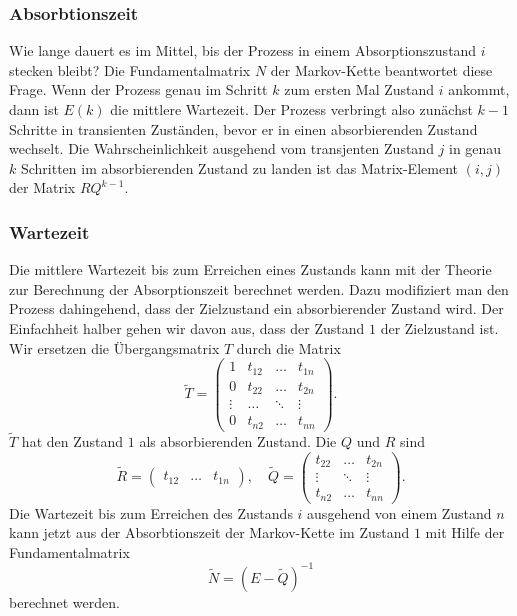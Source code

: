\subsubsection{Absorbtionszeit}
Wie lange dauert es im Mittel, bis der Prozess in einem
Absorptionszustand $i$ stecken bleibt?
Die Fundamentalmatrix $N$ der Markov-Kette beantwortet diese
Frage.
Wenn der Prozess genau im Schritt $k$ zum ersten Mal Zustand $i$
ankommt, dann ist $E(k)$ die mittlere Wartezeit.
Der Prozess verbringt also zunächst $k-1$ Schritte in transienten
Zuständen, bevor er in einen absorbierenden Zustand wechselt.
Die Wahrscheinlichkeit ausgehend vom transjenten Zustand $j$ in
genau $k$ Schritten im absorbierenden Zustand zu landen ist
das Matrix-Element $(i,j)$ der Matrix $RQ^{k-1}$.

\subsubsection{Wartezeit}
Die mittlere Wartezeit bis zum Erreichen eines Zustands kann mit der
Theorie zur Berechnung der Absorptionszeit berechnet werden.
Dazu modifiziert man den Prozess dahingehend, dass der Zielzustand
ein absorbierender Zustand wird.
Der Einfachheit halber gehen wir davon aus, dass der Zustand $1$ 
der Zielzustand ist.
Wir ersetzen die Übergangsmatrix $T$ durch die Matrix
\[
\tilde{T}
=
\left(
\begin{array}{c|ccc}
1     &t_{12}&\dots &t_{1n}\\
\hline
0     &t_{22}&\dots &t_{2n}\\
\vdots&\dots &\ddots&\vdots\\
0     &t_{n2}&\dots &t_{nn}
\end{array}\right).
\]
$\tilde{T}$ hat den Zustand $1$ als absorbierenden Zustand.
Die $Q$ und $R$ sind
\[
\tilde{R}
=
\begin{pmatrix}t_{12}&\dots&t_{1n}\end{pmatrix},
\quad
\tilde{Q}
=
\begin{pmatrix}
t_{22}&\dots &t_{2n}\\
\vdots&\ddots&\vdots\\
t_{n2}&\dots &t_{nn}
\end{pmatrix}.
\]
Die Wartezeit bis zum Erreichen des Zustands $i$ ausgehend von einem
Zustand $n$ kann jetzt aus der Absorbtionszeit der Markov-Kette
im Zustand $1$ mit Hilfe der Fundamentalmatrix
\[
\tilde{N} 
=
(E-\tilde{Q})^{-1}
\]
berechnet werden.


